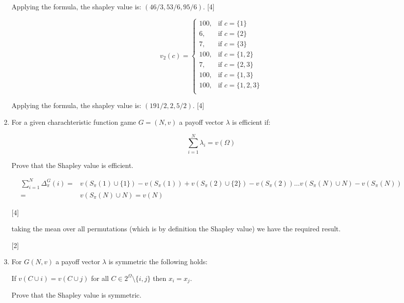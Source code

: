 \documentclass[12pt,a4paper]{article}
\begin{document}
\begin{enumerate}
\begin{enumerate}
            Applying the formula, the shapley value is: \((46/3, 53/6, 95/6)\).
            \hfill{[4]}

            \[
                v_2(c) = \begin{cases}
                    100,& \text{if }c=\{1\}\\
                    6,& \text{if } c=\{2\}\\
                    7,& \text{if } c=\{3\}\\
                    100,& \text{if } c=\{1,2\}\\
                    7,& \text{if } c=\{2,3\}\\
                    100,& \text{if } c=\{1,3\}\\
                    100,& \text{if } c=\{1,2,3\}\\
                \end{cases}
            \]

            Applying the formula, the shapley value is: \((191/2,2,5/2)\).
            \hfill{[4]}

        \item  For a given charachteristic function game \(G=(N,v)\) a payoff vector \(\lambda\) is efficient if:

            \[\sum_{i=1}^{N}\lambda_i=v(\Omega)\]

            Prove that the Shapley value is efficient.

            \begin{align}
                \sum_{i=1}^{N}\Delta_{\pi}^{G}(i)=&v(S_{\pi}(1)\cup \{1\})-v(S_{\pi}(1))+v(S_{\pi}(2)\cup \{2\})-v(S_{\pi}(2))\dots v(S_{\pi}(N)\cup N)-v(S_{\pi}(N))\nonumber\\
                =&v(S_{\pi}(N)\cup N)=v(N)\nonumber
            \end{align}

        \hfill{[4]}

            taking the mean over all permutations (which is by definition the Shapley value) we have the required result.

        \hfill{[2]}

        \item For \(G(N,v)\) a payoff vector \(\lambda\) is symmetric the following holds:

        If \(v(C\cup i)=v(C\cup j)\) for all \(C\in 2^{\Omega}\setminus\{i,j\}\) then \(x_i=x_j\).

        Prove that the Shapley value is symmetric.


\end{enumerate}
\end{enumerate}
\end{document}
